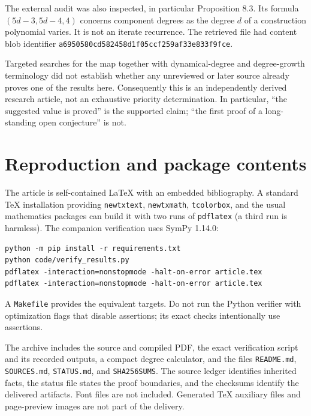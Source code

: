 \documentclass[11pt,a4paper]{article}
\numberwithin{equation}{section}
\theoremstyle{definition}
\theoremstyle{remark}
\begin{document}
The external audit \cite{audit} was also inspected, in particular
Proposition 8.3. Its formula $(5d-3,5d-4,4)$ concerns component
degrees as the degree $d$ of a construction polynomial varies.
It is not an iterate recurrence. The retrieved file had content
blob identifier
\texttt{a6950580cd582458d1f05ccf259af33e833f9fce}.

Targeted searches for the map together with dynamical-degree and
degree-growth terminology did not establish whether any
unreviewed or later source already proves one of the results
here. Consequently this is an independently derived research
article, not an exhaustive priority determination. In particular,
``the suggested value is proved'' is the supported claim;
``the first proof of a long-standing open conjecture'' is not.

\section{Reproduction and package contents}\label{kmd:app:reproduce}

The article is self-contained LaTeX with an embedded bibliography.
A standard TeX installation providing \texttt{newtxtext},
\texttt{newtxmath}, \texttt{tcolorbox}, and the usual mathematics
packages can build it with two runs of \texttt{pdflatex} (a third
run is harmless). The companion verification uses SymPy 1.14.0:
\begin{verbatim}
python -m pip install -r requirements.txt
python code/verify_results.py
pdflatex -interaction=nonstopmode -halt-on-error article.tex
pdflatex -interaction=nonstopmode -halt-on-error article.tex
\end{verbatim}
A \texttt{Makefile} provides the equivalent targets. Do not run the
Python verifier with optimization flags that disable assertions;
its exact checks intentionally use assertions.

The archive includes the source and compiled PDF, the exact
verification script and its recorded outputs, a compact degree
calculator, and the files \texttt{README.md}, \texttt{SOURCES.md},
\texttt{STATUS.md}, and \texttt{SHA256SUMS}. The source ledger
identifies inherited facts, the status file states the proof
boundaries, and the checksums identify the delivered artifacts.
Font files are not included. Generated TeX auxiliary files and
page-preview images are not part of the delivery.
\end{document}
